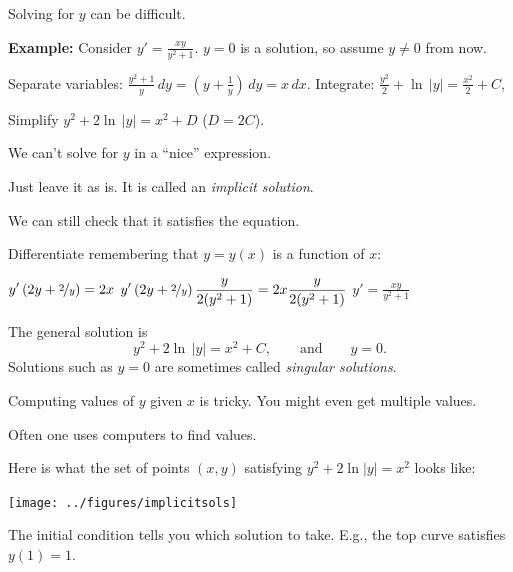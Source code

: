 \documentclass[10pt,aspectratio=169]{beamer}
\begin{document}
\begin{frame}
Solving for $y$ can be difficult.

\medskip
\pause

\textbf{Example:}
Consider \quad
$\displaystyle
y' = \frac{xy}{y^2+1}$.
\qquad
\pause
$y=0$ is a solution, so assume $y\not= 0$ from now.

\medskip
\pause

Separate variables:
\quad
$\displaystyle
\frac{y^2+1}{y}\,dy = \left(y+\frac{1}{y}\right)\,dy = x\,dx$.
\qquad
\pause
Integrate:
\quad
$\displaystyle
\frac{y^2}{2} + \ln \, \lvert y \rvert = \frac{x^2}{2} + C$,

\medskip
\pause

Simplify
\quad
$\displaystyle
y^2 + 2 \ln \, \lvert y\rvert = x^2 + D$
\quad ($D=2C$).

\medskip
\pause

We can't solve for $y$ in a ``nice'' expression.

\pause

Just leave it as is.
\pause
It is called an \emph{implicit solution}.

\medskip
\pause

We can still check that it satisfies the equation.
\pause

Differentiate remembering that $y=y(x)$ is a function of $x$:

\medskip
\pause

\quad
$\displaystyle
y'\left(2y + \nicefrac{2}{y}\right) = 2x$
\pause\wthus
$\displaystyle
y'\left(2y + \nicefrac{2}{y}\right)\frac{y}{2(y^2+1)} = 2x\frac{y}{2(y^2+1)}$
\pause\wthus
$\displaystyle
y' = \frac{xy}{y^2+1}$
\quad
{\Large\checkmark}

\medskip
\pause

The general solution is
\begin{equation*}
y^2 + 2 \ln \, \lvert y \rvert = x^2 + C, \qquad \text{and} \qquad y=0.
\end{equation*}
\pause
Solutions such as $y=0$ are sometimes called \emph{singular solutions}.


\end{frame}

\begin{frame}
Computing values of $y$ given $x$ is tricky.
\pause
You might even get multiple values.

\medskip
\pause

Often one uses computers to find values.

\medskip
\pause

Here is what the set of points $(x,y)$ satisfying 
$y^2+2\ln|y|=x^2$ looks like:

\begin{center}
\texttt{[image: ../figures/implicitsols]}
\end{center}

\medskip
\pause

The initial condition tells you which solution to take.
\pause
E.g., the top curve satisfies $y(1)=1$.

\end{frame}
\end{document}
